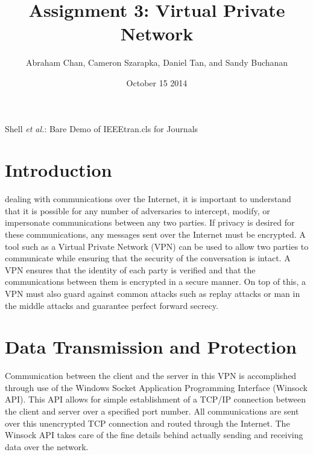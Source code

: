 \documentclass[journal]{IEEEtran}
\date{October 15 2014}
\title{Assignment 3: Virtual Private Network}
\author{Abraham Chan,
	Cameron Szarapka,
	Daniel Tan,
	and Sandy Buchanan}
\begin{document}
\maketitle

%
{Shell \MakeLowercase{\textit{et al.}}: Bare Demo of IEEEtran.cls for Journals}


\section{Introduction}

 dealing with communications over the Internet, it is important to understand that it is possible for any number of adversaries to intercept, modify, or impersonate communications between any two parties. If privacy is desired for these communications, any messages sent over the Internet must be encrypted. A tool such as a Virtual Private Network (VPN) can be used to allow two parties to communicate while ensuring that the security of the conversation is intact. A VPN ensures that the identity of each party is verified and that the communications between them is encrypted in a secure manner. On top of this, a VPN must also guard against common attacks such as replay attacks or man in the middle attacks and guarantee perfect forward secrecy.


\section{Data Transmission and Protection}
Communication between the client and the server in this VPN is accomplished through use of the Windows Socket Application Programming Interface (Winsock API)\cite{sockets}. This API allows for simple establishment of a TCP/IP connection between the client and server over a specified port number. All communications are sent over this unencrypted TCP connection and routed through the Internet. The Winsock API takes care of the fine details behind actually sending and receiving data over the network.
\end{document}
